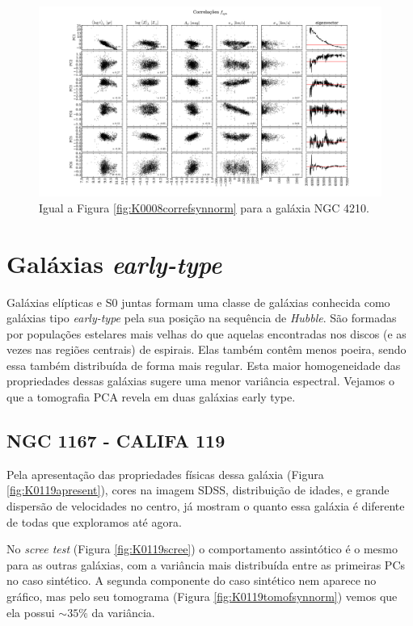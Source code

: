 \begin{figure}
    \includegraphics[width=1.2\textwidth, angle=-90]{figuras/K0518-correl-f_syn_norm-PCvsPhys.pdf}
	\caption[Correlações PCs vs. par\^ametros f\'isicos -um padrão de velocidades $f_{syn}$ - NGC 4210.]
	{Igual a Figura \ref{fig:K0008correfsynnorm} para a galáxia NGC 4210.}
    \label{fig:K0518correfsynnorm}
\end{figure}

\section{Gal\'axias {\em early-type}}
\label{sec:result:elipt}

Galáxias elípticas e S0 juntas formam uma classe de galáxias conhecida como galáxias tipo {\em early-type} pela sua
posição na sequência de {\em Hubble}. São formadas por populações estelares mais velhas do que aquelas encontradas nos
discos (e as vezes nas regiões centrais) de espirais. Elas também contêm menos poeira, sendo essa também distribuída de
forma mais regular. Esta maior homogeneidade das propriedades dessas galáxias sugere uma menor variância espectral.
Vejamos o que a tomografia PCA revela em duas galáxias early type.

\subsection{NGC 1167 - CALIFA 119}

Pela apresentação das propriedades físicas dessa galáxia (Figura \ref{fig:K0119apresent}), cores na imagem SDSS,
distribuição de idades, e grande dispersão de velocidades no centro, já mostram o quanto essa galáxia é diferente de
todas que exploramos até agora.

No {\em scree test} (Figura \ref{fig:K0119scree}) o comportamento assintótico é o mesmo para as outras galáxias, com a
variância mais distribuída entre as primeiras PCs no caso sintético. A segunda componente do caso sintético nem aparece
no gráfico, mas pelo seu tomograma (Figura \ref{fig:K0119tomofsynnorm}) vemos que ela possui $\sim 35\%$ da variância.

